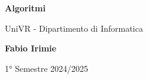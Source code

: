 \begin{titlepage}
	\begin{center}
		\vspace*{1cm}

		\Huge
		\textbf{Algoritmi}

		\vspace{0.5cm}
		\LARGE
		UniVR - Dipartimento di Informatica

		\vspace{1.5cm}

		\textbf{Fabio Irimie}

		\vfill


		\vspace{0.8cm}


		1° Semestre 2024/2025

	\end{center}
\end{titlepage}
